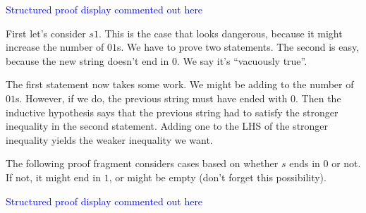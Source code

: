\begin{definition}
\begin{staffnotes}
\textcolor{blue}{Structured proof display commented out here}

First let's consider $s1$. This is the case that looks dangerous,
because it might increase the number of $01$s.  We have to prove two
statements.  The second is easy, because the new string doesn't end in
$0$.  We say it's ``vacuously true''.

The first statement now takes some work. 
We might be adding to the number of $01$s.  
However, if we do, the previous string must have ended with $0$. 
Then the inductive hypothesis says that the previous string had to
satisfy the stronger inequality in the second statement. 
Adding one to the LHS of the stronger inequality yields the weaker
inequality we want.

The following proof fragment considers cases based on whether $s$ ends
in $0$ or not.  If not, it might end in $1$, or might be empty (don't
forget this possibility).

\textcolor{blue}{Structured proof display commented out here}
\iffalse

\begin{proof}
  3. $P(s 1)$ \\
  1. $\ms{num}(01,s1) \leq \ms{num}(10,s1) + 1$. \\
  1. If $s$ ends in $0$ then $\ms{num}(01,s1) \leq\ms{num}(10,s1) + 1$. \\
  1. Assume $s$ ends in $0$. \\
  2. $\ms{num}(01,s) \leq \ms{num}(10,s)$ 
  Inductive hypothesis (3.2), part 2. \\
  3. $\ms{num}(01,s1) = \ms{num}(01,s) + 1$ 
  Adding one more $01$. \\
  4. $\ms{num}(10,s1) = \ms{num}(10,s)$ \\
  5. $\ms{num}(01,s1) \leq\ms{num}(10,s1) + 1$. 
  Algebra (combining 3.3.1.1.2, ...3, and ...4) \\
  QED 
  Implication \\
  2. If $s$ ends in $1$ then $\ms{num}(01,s1)\leq\ms{num}(10,s1) + 1$. \\
  Inductive hypothesis, part 1; no new $01$s. \\
  3. If $s = \emptystring$ then $\ms{num}(01,s1) \leq\ms{num}(10,s1)+ 1$. \\
  $s1$ is just $1$, which has no $01$s. \\
  4. QED 
  Cases \\
  2. If $s 1$ ends in $0$ then $\ms{num}(01,s1) \leq \ms{num}(10,s1)$. \\
  Vacuously true, because $s1$ doesn't end in $0$. \\
  3. QED
  Conjunction \\
\end{proof}
\fi


\end{staffnotes}
\end{definition}
